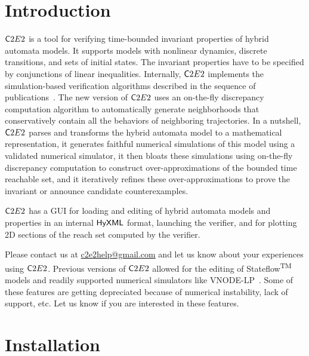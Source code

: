 \documentclass{tufte-book} %
\begin{document}
\chapter{Introduction}
\label{sec:intro}
${{\mathsf C2E2}}$ is a tool for verifying time-bounded invariant properties of hybrid automata models. It supports models with nonlinear dynamics, discrete transitions, and sets of initial states. The invariant properties have to be specified by conjunctions of linear inequalities. Internally, ${{\mathsf C2E2}}$ implements the simulation-based verification algorithms described in the sequence of publications~\citet{fan2016automatic,ChuchuATVA,DMV13,DuggiralaWMVM14,SM:HSCC2011}. The new version of ${{\mathsf C2E2}}$ uses an on-the-fly discrepancy computation algorithm \citet{ChuchuATVA} to automatically generate neighborhoods that conservatively contain all the behaviors of neighboring trajectories. In a nutshell, ${{\mathsf C2E2}}$ parses and transforms the hybrid automata model to a mathematical representation, it generates faithful numerical simulations of this model using a validated numerical simulator, it then bloats these simulations using on-the-fly discrepancy computation to construct over-approximations of the bounded time reachable set, and it iteratively refines these over-approximations to prove the invariant or announce candidate counterexamples.

${{\mathsf C2E2}}$ has a GUI for loading and editing of hybrid automata models and properties in an internal ${{\sf HyXML}}$ format, launching the verifier, and for plotting 2D sections of the reach set computed by the verifier. 

Please contact us at \href{mailto:c2e2help@gmail.com}{c2e2help@gmail.com} and let us know about your experiences using ${{\mathsf C2E2}}$. 
Previous versions of ${{\mathsf C2E2}}$ allowed for the editing of Stateflow\textsuperscript{TM} models and readily supported numerical simulators like {\sf VNODE-LP}~\citet{vnode2006}. Some of these features are getting depreciated because of numerical instability, lack of support, etc. Let us know if you are interested in these features. 

\chapter{Installation}
\label{chap:install}
\end{document}
